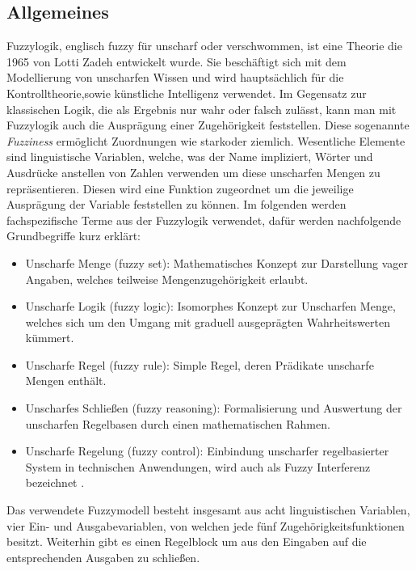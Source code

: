 \subsection{Allgemeines}
Fuzzylogik, englisch fuzzy für unscharf oder verschwommen, ist eine Theorie die 1965 von Lotti Zadeh entwickelt wurde. Sie beschäftigt sich mit dem Modellierung von unscharfen Wissen und wird hauptsächlich für die Kontrolltheorie,sowie künstliche Intelligenz verwendet. Im Gegensatz zur klassischen Logik, die als Ergebnis nur wahr oder falsch zulässt, kann man mit Fuzzylogik auch die Ausprägung einer Zugehörigkeit feststellen. Diese sogenannte \textit{Fuzziness} ermöglicht Zuordnungen wie \grqq stark\grqq \space oder \grqq ziemlich\grqq. Wesentliche Elemente sind linguistische Variablen, welche, was der Name impliziert, Wörter und Ausdrücke anstellen von Zahlen verwenden um diese unscharfen Mengen zu repräsentieren. Diesen wird eine Funktion zugeordnet um die jeweilige Ausprägung der Variable feststellen zu können.\cite{fuzzylogik} \newline
Im folgenden werden fachspezifische Terme aus der Fuzzylogik verwendet, dafür werden nachfolgende Grundbegriffe kurz erklärt:
\begin{itemize}
	\item Unscharfe Menge (fuzzy set): Mathematisches Konzept zur Darstellung vager Angaben, welches teilweise Mengenzugehörigkeit erlaubt.\cite{fuzzybook}\cite{WissensbasierteSysteme}
	\item Unscharfe Logik (fuzzy logic): Isomorphes Konzept zur Unscharfen Menge, welches sich um den Umgang mit graduell ausgeprägten Wahrheitswerten kümmert.\cite{fuzzybook}\cite{WissensbasierteSysteme}
	\item Unscharfe Regel (fuzzy rule): Simple Regel, deren Prädikate unscharfe Mengen enthält.\cite{fuzzybook}\cite{WissensbasierteSysteme}
	\item Unscharfes Schließen (fuzzy reasoning): Formalisierung und Auswertung der unscharfen Regelbasen durch einen mathematischen Rahmen.\cite{fuzzybook}\cite{WissensbasierteSysteme}
	\item Unscharfe Regelung (fuzzy control): Einbindung unscharfer regelbasierter System in technischen Anwendungen, wird auch als Fuzzy Interferenz bezeichnet \cite{fuzzybook}\cite{WissensbasierteSysteme}. 
\end{itemize}
Das verwendete Fuzzymodell besteht insgesamt aus acht linguistischen Variablen, vier Ein- und Ausgabevariablen, von welchen jede fünf Zugehörigkeitsfunktionen besitzt. Weiterhin gibt es einen Regelblock um aus den Eingaben auf die entsprechenden Ausgaben zu schließen.


